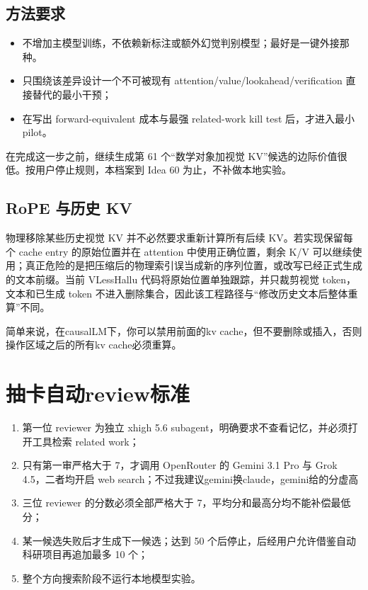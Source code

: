 \documentclass[UTF8,zihao=-4,a4paper]{ctexart}
\begin{document}
\subsection{方法要求}

\begin{itemize}
  \item 不增加主模型训练，不依赖新标注或额外幻觉判别模型；最好是一键外接那种。
  \item 只围绕该差异设计一个不可被现有 attention/value/lookahead/verification 直接替代的最小干预；
  \item 在写出 forward-equivalent 成本与最强 related-work kill test 后，才进入最小 pilot。
\end{itemize}

在完成这一步之前，继续生成第 61 个“数学对象加视觉 KV”候选的边际价值很低。按用户停止规则，本档案到 Idea 60 为止，不补做本地实验。

\subsection{RoPE 与历史 KV}

物理移除某些历史视觉 KV 并不必然要求重新计算所有后续 KV。若实现保留每个 cache entry 的原始位置并在 attention 中使用正确位置，剩余 K/V 可以继续使用；真正危险的是把压缩后的物理索引误当成新的序列位置，或改写已经正式生成的文本前缀。当前 VLessHallu 代码将原始位置单独跟踪，并只裁剪视觉 token，文本和已生成 token 不进入删除集合，因此该工程路径与“修改历史文本后整体重算”不同。

简单来说，在causalLM下，你可以禁用前面的kv cache，但不要删除或插入，否则操作区域之后的所有kv cache必须重算。

\section{抽卡自动review标准}

\begin{enumerate}
  \item 第一位 reviewer 为独立 xhigh 5.6 subagent，明确要求不查看记忆，并必须打开工具检索 related work；
  \item 只有第一审严格大于 7，才调用 OpenRouter 的 Gemini 3.1 Pro 与 Grok 4.5，二者均开启 web search；不过我建议gemini换claude，gemini给的分虚高
  \item 三位 reviewer 的分数必须全部严格大于 7，平均分和最高分均不能补偿最低分；
  \item 某一候选失败后才生成下一候选；达到 50 个后停止，后经用户允许借鉴自动科研项目再追加最多 10 个；
  \item 整个方向搜索阶段不运行本地模型实验。
\end{enumerate}
\end{document}
